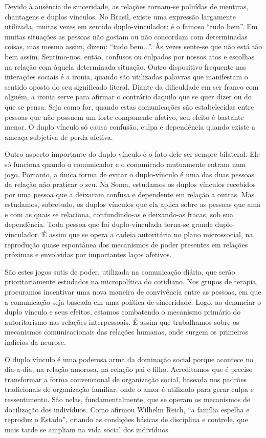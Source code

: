 Devido à ausência de sinceridade, as relações tornam-se poluídas de
mentiras, chantagens e duplos vínculos. No Brasil, existe uma expressão
largamente utilizada, muitas vezes em sentido duplo-vinculador: é o
famoso ``tudo bem''. Em muitas situações as pessoas não gostam ou não
concordam com determinadas coisas, mas mesmo assim, dizem: ``tudo
bem...''. Às vezes sente-se que não está tão bem assim. Sentimo-nos,
então, confusos ou culpados por nossos atos e escolhas na relação com
àquela determinada situação. Outro dispositivo frequente nas interações
sociais é a ironia, quando são utilizadas palavras que manifestam o
sentido oposto do seu significado literal. Diante da dificuldade em ser
franco com alguém, a ironia serve para afirmar o contrário daquilo que
se quer dizer ou do que se pensa. Seja como for, quando estas
comunicações são estabelecidas entre pessoas que não possuem um forte
componente afetivo, seu efeito é bastante menor. O duplo vínculo só
causa confusão, culpa e dependência quando existe a ameaça subjetiva de
perda afetiva.

Outro aspecto importante do duplo-vínculo é o fato dele ser sempre
bilateral. Ele só funciona quando o comunicador e o comunicado
mutuamente entram num jogo. Portanto, a única forma de evitar o
duplo-vínculo é uma das duas pessoas da relação não praticar o seu. Na
Soma, estudamos os duplos vínculos recebidos por uma pessoa que a
deixaram confusa e dependente em relação a outras. Mas estudamos,
sobretudo, os duplos vínculos que ela aplica sobre as pessoas que ama e
com as quais se relaciona, confundindo-as e deixando-as fracas, sob sua
dependência. Toda pessoa que foi duplo-vinculada torna-se grande
duplo-vinculador. É assim que se opera a cadeia autoritária no plano
microssocial, na reprodução quase espontânea dos mecanismos de poder
presentes em relações próximas e envolvidas por importantes laços
afetivos.

São estes jogos sutis de poder, utilizada na comunicação diária, que
serão prioritariamente estudados na micropolítica do cotidiano. Nos
grupos de terapia, procuramos incentivar uma nova maneira de convivência
entre as pessoas, em que a comunicação seja baseada em uma política de
sinceridade. Logo, ao denunciar o duplo vínculo e seus efeitos, estamos
combatendo o mecanismo primário do autoritarismo nas relações
interpessoais. É assim que trabalhamos sobre os mecanismos
comunicacionais das relações humanas, onde surgem os primeiros indícios
da neurose.

O duplo vínculo é uma poderosa arma da dominação social porque acontece
no dia-a-dia, na relação amorosa, na relação pai e filho. Acreditamos
que é preciso transformar a forma convencional de organização social,
baseada nos padrões tradicionais de organização familiar, onde o amor é
utilizado para gerar culpa e ressentimento. São nelas, fundamentalmente,
que se operam os mecanismos de docilização dos indivíduos. Como afirmou
Wilhelm Reich, ``a família espelha e reproduz o Estado'', criando as
condições básicas de disciplina e controle, que mais tarde se ampliam na
vida social dos indivíduos.

